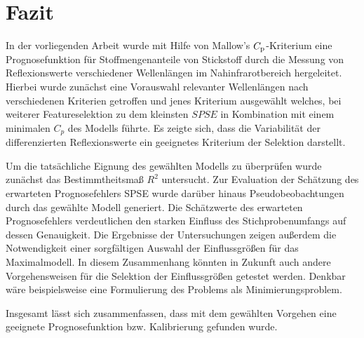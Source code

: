 \section{Fazit}
\label{sec:Fazit}

    In der vorliegenden Arbeit wurde mit Hilfe von Mallow's $C_{\mathrm{p}}$-Kriterium eine Prognosefunktion für Stoffmengenanteile von Stickstoff durch die Messung von Reflexionswerte verschiedener Wellenlängen im Nahinfrarotbereich hergeleitet.
    Hierbei wurde zunächst eine Vorauswahl relevanter Wellenlängen nach verschiedenen Kriterien getroffen und jenes Kriterium ausgewählt welches, bei weiterer Featureselektion zu dem kleinsten $SPSE$ in Kombination mit einem minimalen $C_{p}$ des Modells führte.
    Es zeigte sich, dass die Variabilität der differenzierten Reflexionswerte ein geeignetes Kriterium der Selektion darstellt.
    
    Um die tatsächliche Eignung des gewählten Modells zu überprüfen wurde zunächst das Bestimmtheitsmaß $R^2$ untersucht.
    Zur Evaluation der Schätzung des erwarteten Prognosefehlers SPSE wurde darüber hinaus Pseudobeobachtungen durch das gewählte Modell generiert.
    Die Schätzwerte des erwarteten Prognosefehlers verdeutlichen den starken Einfluss des Stichprobenumfangs auf dessen Genauigkeit.
    Die Ergebnisse der Untersuchungen zeigen außerdem die Notwendigkeit einer sorgfältigen Auswahl der Einflussgrößen für das Maximalmodell.
    In diesem Zusammenhang könnten in Zukunft auch andere Vorgehensweisen für die Selektion der Einflussgrößen getestet werden.
    Denkbar wäre beispielsweise eine Formulierung des Problems als Minimierungsproblem.\cite{Menzel2016}
    
    Insgesamt lässt sich zusammenfassen, dass mit dem gewählten Vorgehen eine geeignete Prognosefunktion bzw. Kalibrierung gefunden wurde.
    
